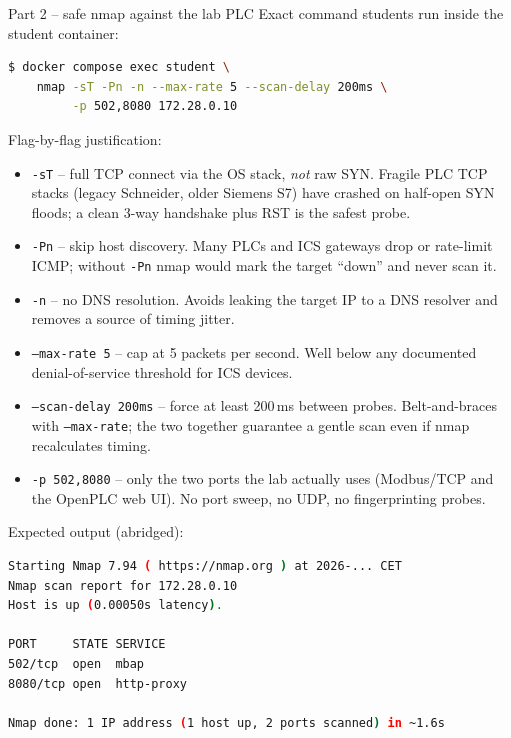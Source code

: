 \documentclass[11pt,a4paper]{article}
\begin{document}
\begin{solutionbox}{Part 2 -- safe nmap against the lab PLC}
Exact command students run inside the student container:

\begin{lstlisting}[language=bash]
$ docker compose exec student \
    nmap -sT -Pn -n --max-rate 5 --scan-delay 200ms \
         -p 502,8080 172.28.0.10
\end{lstlisting}

Flag-by-flag justification:
\begin{itemize}[leftmargin=*, nosep]
  \item \texttt{-sT} -- full TCP connect via the OS stack, \emph{not} raw SYN. Fragile PLC TCP stacks (legacy Schneider, older Siemens S7) have crashed on half-open SYN floods; a clean 3-way handshake plus RST is the safest probe.
  \item \texttt{-Pn} -- skip host discovery. Many PLCs and ICS gateways drop or rate-limit ICMP; without \texttt{-Pn} nmap would mark the target ``down'' and never scan it.
  \item \texttt{-n} -- no DNS resolution. Avoids leaking the target IP to a DNS resolver and removes a source of timing jitter.
  \item \texttt{--max-rate 5} -- cap at 5 packets per second. Well below any documented denial-of-service threshold for ICS devices.
  \item \texttt{--scan-delay 200ms} -- force at least 200\,ms between probes. Belt-and-braces with \texttt{--max-rate}; the two together guarantee a gentle scan even if nmap recalculates timing.
  \item \texttt{-p 502,8080} -- only the two ports the lab actually uses (Modbus/TCP and the OpenPLC web UI). No port sweep, no UDP, no fingerprinting probes.
\end{itemize}

Expected output (abridged):
\begin{lstlisting}[language=bash]
Starting Nmap 7.94 ( https://nmap.org ) at 2026-... CET
Nmap scan report for 172.28.0.10
Host is up (0.00050s latency).

PORT     STATE SERVICE
502/tcp  open  mbap
8080/tcp open  http-proxy

Nmap done: 1 IP address (1 host up, 2 ports scanned) in ~1.6s
\end{lstlisting}
\end{solutionbox}
\end{document}

